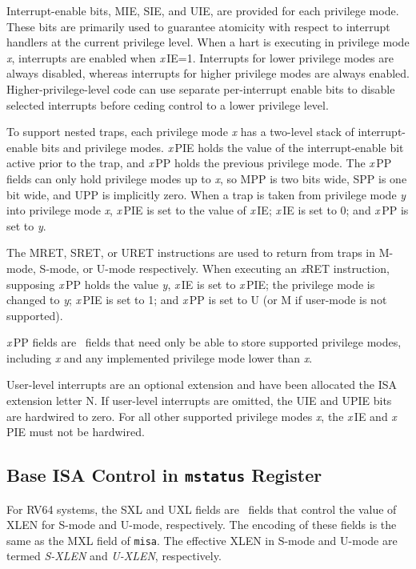 Interrupt-enable bits, MIE, SIE, and UIE, are provided for each privilege
mode.  These bits are primarily used to guarantee atomicity with respect to
interrupt handlers at the current privilege level.  When a hart is executing
in privilege mode {\em x}, interrupts are enabled when {\em x}\,IE=1.
Interrupts for lower privilege modes are always disabled, whereas interrupts
for higher privilege modes are always enabled.  Higher-privilege-level code
can use separate per-interrupt enable bits to disable selected interrupts
before ceding control to a lower privilege level.

To support nested traps, each privilege mode {\em x} has a two-level
stack of interrupt-enable bits and privilege modes.  {\em x}\,PIE
holds the value of the interrupt-enable bit active prior to the trap,
and {\em x}\,PP holds the previous privilege mode.  The {\em x}\,PP
fields can only hold privilege modes up to {\em x}, so MPP is
two bits wide, SPP is one bit wide, and UPP is implicitly zero.  When
a trap is taken from privilege mode {\em y} into privilege mode {\em
  x}, {\em x}\,PIE is set to the value of {\em x}\,IE; {\em x}\,IE is set to
0; and {\em x}\,PP is set to {\em y}.

The MRET, SRET, or URET instructions are used to return from
traps in M-mode, S-mode, or U-mode respectively.  When
executing an {\em x}RET instruction, supposing {\em x}\,PP holds the
value {\em y}, {\em x}\,IE is set to {\em x}\,PIE; the privilege mode
is changed to {\em y}; {\em x}\,PIE is set to 1; and {\em x}\,PP is
set to U (or M if user-mode is not supported).

{\em x}\,PP fields are \wlrl\ fields that need only be able to store
supported privilege modes, including {\em x} and any implemented
privilege mode lower than {\em x}.

User-level interrupts are an optional extension and have been
allocated the ISA extension letter N.
If user-level interrupts are omitted, the
UIE and UPIE bits are hardwired to zero.  For all other supported
privilege modes {\em x}, the {\em x}\,IE and {\em x}\,PIE must not
be hardwired.

\subsection{Base ISA Control in {\tt mstatus} Register}

For RV64 systems, the SXL and UXL fields are \warl\ fields
that control the value of XLEN for S-mode and U-mode,
respectively. The encoding of these fields is the same as the MXL
field of {\tt misa}.  The effective
XLEN in S-mode and U-mode are termed {\em S-XLEN} and {\em U-XLEN},
respectively.

